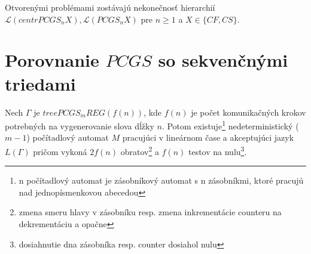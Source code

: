 \begin{poznamka}
Otvorenými problémami zostávajú nekonečnosť hierarchií\newline
$\mathcal{L}(centrPCGS_nX),\mathcal{L}(PCGS_nX)$ pre $n\geq 1$ a
$X\in\{ CF,CS\}$.
\end{poznamka}

\section{Porovnanie $PCGS$ so sekvenčnými triedami}

\begin{veta}
\label{pcgs_veta_multicounter} Nech $\Gamma$ je $treePCGS_mREG(f(n))$,
kde $f(n)$ je počet komunikačných krokov potrebných na
vygenerovanie slova dĺžky $n$. Potom existuje\footnote{n
počítadlový automat je zásobníkový automat s n zásobníkmi, ktoré
pracujú nad jednopísmenkovou abecedou} nedeterministický ($m-1$)
počítadlový automat $M$ pracujúci v lineárnom čase a akceptujúci
jazyk $L(\Gamma)$ pričom vykoná $2f(n)$ obratov\footnote{zmena
smeru hlavy v zásobníku resp. zmena inkrementácie counteru na
dekrementáciu a opačne} a $f(n)$ testov na
nulu\footnote{dosiahnutie dna zásobníka resp. counter dosiahol
nulu}.
\end{veta}

\pagebreak


